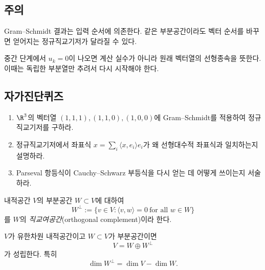 \subsection*{주의}
\begin{warning}
Gram--Schmidt 결과는 입력 순서에 의존한다. 같은 부분공간이라도 벡터 순서를 바꾸면 얻어지는 정규직교기저가 달라질 수 있다.
\end{warning}
\begin{warning}
중간 단계에서 $u_k=0$이 나오면 계산 실수가 아니라 원래 벡터열의 선형종속을 뜻한다. 이때는 독립한 부분열만 추려서 다시 시작해야 한다.
\end{warning}

\subsection*{자가진단퀴즈}
\begin{enumerate}[label=\arabic*.]
\item $\R^3$의 벡터열 $(1,1,1),(1,1,0),(1,0,0)$에 Gram--Schmidt를 적용하여 정규직교기저를 구하라.
\item 정규직교기저에서 좌표식 $x=\sum_i\langle x,e_i\rangle e_i$가 왜 선형대수적 좌표식과 일치하는지 설명하라.
\item Parseval 항등식이 Cauchy--Schwarz 부등식을 다시 얻는 데 어떻게 쓰이는지 서술하라.
\end{enumerate}


\begin{definition}
내적공간 $V$의 부분공간 $W\subset V$에 대하여
$$
W^\perp:=\{v\in V:\langle v,w\rangle=0\ \text{for all }w\in W\}
$$
를 $W$의 \emph{직교여공간}(orthogonal complement)이라 한다.
\end{definition}

\begin{theorem}[직교분해 정리]
$V$가 유한차원 내적공간이고 $W\subset V$가 부분공간이면
$$
V=W\oplus W^\perp
$$
가 성립한다. 특히
$$
\dim W^\perp=\dim V-\dim W.
$$
\end{theorem}

